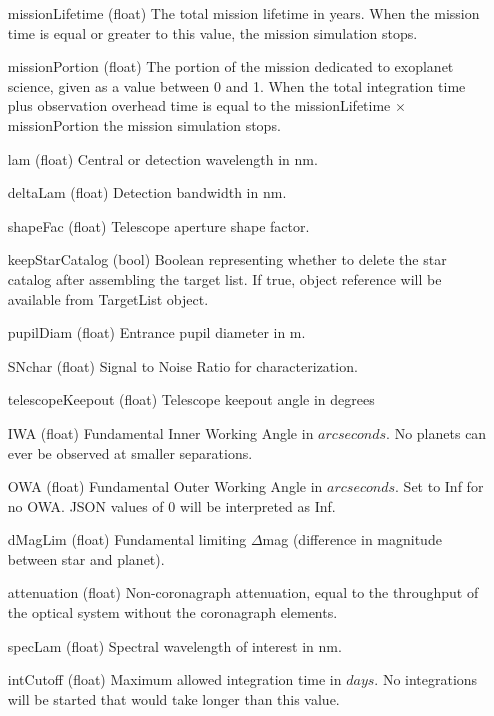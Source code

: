 \documentclass[cleanfoot]{asme2ej}
\begin{document}
\begin{itemize}[leftmargin=1in,font={\ttfamily}]
\item[missionLifetime] (float) The total mission lifetime in years.  When the mission time is equal or greater to this value, the mission simulation stops.
\item[missionPortion] (float) The portion of the mission dedicated to exoplanet science, given as a value between 0 and 1.  When the total integration time plus observation overhead time is equal to the missionLifetime $\times$ missionPortion the mission simulation stops.
\item[lam]  (float) Central or detection wavelength in nm.
\item[deltaLam]  (float) Detection bandwidth in nm.
\item[shapeFac] (float)  Telescope aperture shape factor.
\item[keepStarCatalog] (bool) Boolean representing whether to delete the star catalog after assembling the target list.  If true, object reference will be available from TargetList object.
\item[pupilDiam] (float) Entrance pupil diameter in m.
\item[SNchar] (float) Signal to Noise Ratio for characterization.
\item[telescopeKeepout] (float) Telescope keepout angle in degrees
\item[IWA] (float) Fundamental Inner Working Angle in $ arcseconds $. No planets can ever be observed at smaller separations.
\item[OWA] (float) Fundamental Outer Working Angle in $ arcseconds $. Set to Inf for no OWA. JSON values of 0 will be interpreted as Inf.
\item[dMagLim] (float) Fundamental limiting $\Delta$mag (difference in magnitude between star and planet). 
\item[attenuation] (float) Non-coronagraph attenuation, equal to the throughput of the optical system without the coronagraph elements.
\item[specLam] (float) Spectral wavelength of interest in nm.
\item[intCutoff] (float)  Maximum allowed integration time in $ days $. No integrations will be started that would take longer than this value.
\end{itemize}

\end{document}
